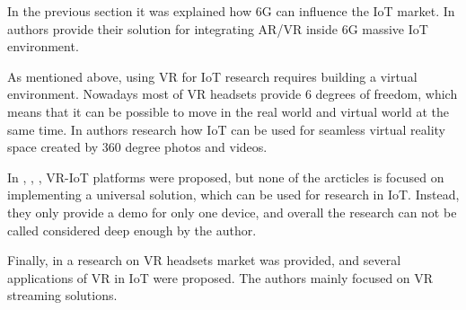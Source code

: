 In the previous section it was explained how 6G can influence the IoT market. In \cite{liao_information-centric_2021} authors provide their solution for integrating AR/VR inside 6G massive IoT environment.

As mentioned above, using VR for IoT research requires building a virtual environment. Nowadays most of VR headsets provide 6 degrees of freedom, which means that it can be possible to move in the real world and virtual world at the same time. In \cite{you_internet_2018} authors research how IoT can be used for seamless virtual reality space created by 360 degree photos and videos.

In \cite{myeong-in_choi_design_2017}, \cite{simiscuka_synchronisation_2018}, \cite{simiscuka_real-virtual_2019}, \cite{krishnan_performance_2020} VR-IoT platforms were proposed, but none of the arcticles is focused on implementing a universal solution, which can be used for research in IoT. Instead, they only provide a demo for only one device, and overall the research can not be called considered deep enough by the author.

Finally, in \cite{hu_virtual_2021} a research on VR headsets market was provided, and several applications of VR in IoT were proposed. The authors mainly focused on VR streaming solutions.